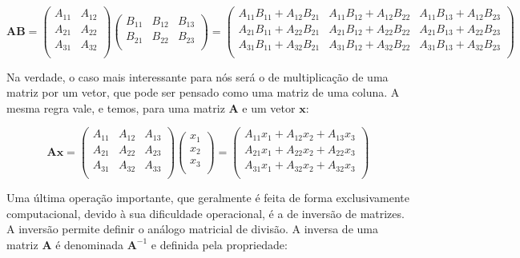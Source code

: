 \documentclass[portuges,]{tufte-handout}
\begin{document}
\[
\mathbf{A}\mathbf{B} =
\left (
\begin{matrix}
A_{11} & A_{12} \\
A_{21} & A_{22}  \\
A_{31} & A_{32} \\
\end{matrix}
\right )
\left (
\begin{matrix}
B_{11} & B_{12} & B_{13} \\
B_{21} & B_{22} & B_{23} \\
\end{matrix}
\right )
=
\left (
\begin{smallmatrix}
A_{11}B_{11} +  A_{12}B_{21} & A_{11}B_{12} +  A_{12}B_{22} & A_{11}B_{13} +  A_{12}B_{23} \\
A_{21}B_{11} +  A_{22}B_{21} & A_{21}B_{12} +  A_{22}B_{22} & A_{21}B_{13} +  A_{22}B_{23} \\
A_{31}B_{11} +  A_{32}B_{21} & A_{31}B_{12} +  A_{32}B_{22} & A_{31}B_{13} +  A_{32}B_{23} \\
\end{smallmatrix}
\right )
\]

Na verdade, o caso mais interessante para nós será o de multiplicação de
uma matriz por um vetor, que pode ser pensado como uma matriz de uma
coluna. A mesma regra vale, e temos, para uma matriz $\mathbf{A}$ e um
vetor $\mathbf{x}$:

\[
\mathbf{A}\mathbf{x}  =
\left (
\begin{matrix}
A_{11} & A_{12} & A_{13}\\
A_{21} & A_{22} & A_{23} \\
A_{31} & A_{32} & A_{33}\\
\end{matrix}
\right )
\left (
\begin{matrix}
x_{1}  \\
x_{2}   \\
x_{3}  \\
\end{matrix}
\right )
=
\left (
\begin{matrix}
A_{11}x_{1} +  A_{12}x_{2} +  A_{13}x_{3}\\
A_{21}x_{1} +  A_{22}x_{2} +  A_{22}x_{3}\\
A_{31}x_{1} +  A_{32}x_{2} +  A_{32}x_{3}\\
\end{matrix}
\right )
\]

Uma última operação importante, que geralmente é feita de forma
exclusivamente computacional, devido à sua dificuldade operacional, é a
de inversão de matrizes. A inversão permite definir o análogo matricial
de divisão. A inversa de uma matriz $\mathbf{A}$ é denominada
$\mathbf{A}^{-1}$ e definida pela propriedade:
\end{document}
